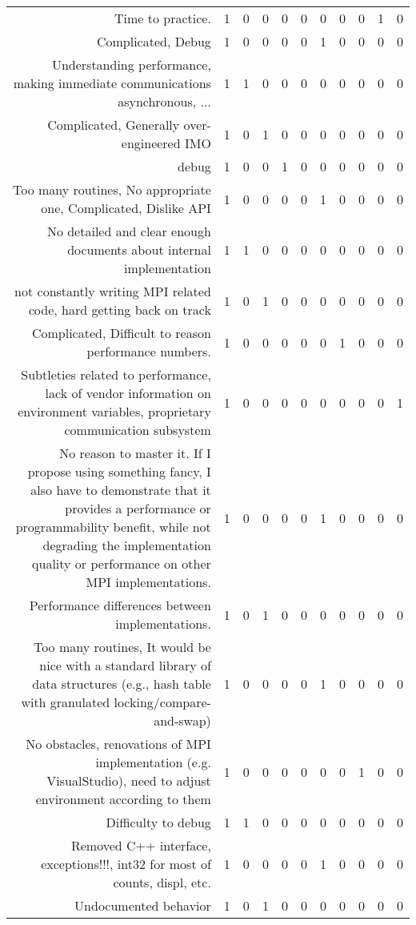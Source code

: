 {\begin{landscape}
\begin{longtable}[htb]{r|c|c|c|c|c|c|c|c|c|c}
{Time to practice.} & 1 & 0 & 0 & 0 & 0 & 0 & 0 & 0 & 1 & 0 \\%
{Complicated, Debug} & 1 & 0 & 0 & 0 & 0 & 1 & 0 & 0 & 0 & 0 \\%
{Understanding performance, making immediate communications asynchronous, ...} & 1 & 1 & 0 & 0 & 0 & 0 & 0 & 0 & 0 & 0 \\%
{Complicated, Generally over-engineered IMO} & 1 & 0 & 1 & 0 & 0 & 0 & 0 & 0 & 0 & 0 \\%
{debug} & 1 & 0 & 0 & 1 & 0 & 0 & 0 & 0 & 0 & 0 \\%
{Too many routines, No appropriate one, Complicated, Dislike API} & 1 & 0 & 0 & 0 & 0 & 1 & 0 & 0 & 0 & 0 \\%
{No detailed and clear enough documents about internal implementation} & 1 & 1 & 0 & 0 & 0 & 0 & 0 & 0 & 0 & 0 \\%
{not constantly writing MPI related code, hard getting back on track} & 1 & 0 & 1 & 0 & 0 & 0 & 0 & 0 & 0 & 0 \\%
{Complicated, Difficult to reason performance numbers.} & 1 & 0 & 0 & 0 & 0 & 0 & 1 & 0 & 0 & 0 \\%
{Subtleties related to performance, lack of vendor information on environment variables, proprietary communication subsystem} & 1 & 0 & 0 & 0 & 0 & 0 & 0 & 0 & 0 & 1 \\%
{No reason to master it. If I propose using something fancy, I also have to demonstrate that it provides a performance or programmability benefit, while not degrading the implementation quality or performance on other MPI implementations.} & 1 & 0 & 0 & 0 & 0 & 1 & 0 & 0 & 0 & 0 \\%
{Performance differences between implementations.} & 1 & 0 & 1 & 0 & 0 & 0 & 0 & 0 & 0 & 0 \\%
{Too many routines, It would be nice with a standard library of data structures (e.g., hash table with granulated locking/compare-and-swap)} & 1 & 0 & 0 & 0 & 0 & 1 & 0 & 0 & 0 & 0 \\%
{No obstacles, renovations of MPI implementation (e.g. VisualStudio), need to adjust environment according to them} & 1 & 0 & 0 & 0 & 0 & 0 & 0 & 1 & 0 & 0 \\%
{Difficulty to debug} & 1 & 1 & 0 & 0 & 0 & 0 & 0 & 0 & 0 & 0 \\%
{Removed C++ interface, exceptions!!!, int32 for most of counts, displ, etc.} & 1 & 0 & 0 & 0 & 0 & 1 & 0 & 0 & 0 & 0 \\%
{Undocumented behavior} & 1 & 0 & 1 & 0 & 0 & 0 & 0 & 0 & 0 & 0 \\%

\end{longtable}
\end{landscape}}
